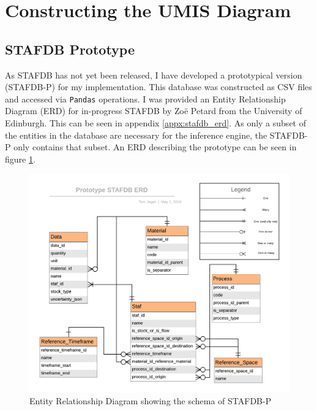 \documentclass[ %
                    author={Tom Jager},
                supervisor={Dr. Daniel Schien},
                    degree={MEng},
                     title={A Bayesian Inference Engine for Calibrating Uncertainty over UMIS Structured MFA Systems},
                  subtitle={},
                      type={research},
                      year={2019} ]{dissertation}
\begin{document}
\section{Constructing the UMIS Diagram}

\subsection{STAFDB Prototype}
\label{sec:prototype_stafdb}
As STAFDB has not yet been released, I have developed a prototypical version (STAFDB-P) for my implementation. This database was constructed as CSV files and accessed via \texttt{Pandas} operations. I was provided an Entity Relationship Diagram (ERD) for in-progress STAFDB by Zo\"e Petard from the University of Edinburgh. This can be seen in appendix \ref{appx:stafdb_erd}. As only a subset of the entities in the database are necessary for the inference engine, the STAFDB-P only contains that subset. An ERD describing the prototype can be seen in figure \ref{fig:prototype_ern}.

\begin{figure}
    \centering
    \includegraphics[width=\linewidth]{images/Prototype_STAFDB_ERD.png}
    \caption{Entity Relationship Diagram showing the schema of STAFDB-P}
    \label{fig:prototype_ern}
\end{figure}
\end{document}
